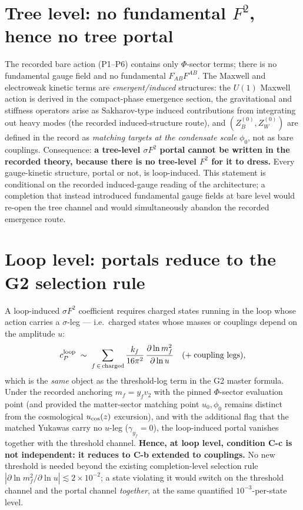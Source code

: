 \documentclass[11pt,a4paper]{article}
\begin{document}
\section{Tree level: no fundamental $F^2$, hence no tree portal}
The recorded bare action (P1--P6) contains only $\Phi$-sector terms; there is
no fundamental gauge field and no fundamental $F_{AB}F^{AB}$. The Maxwell and
electroweak kinetic terms are \emph{emergent/induced} structures: the $U(1)$
Maxwell action is derived in the compact-phase emergence section, the
gravitational and stiffness operators arise as Sakharov-type induced
contributions from integrating out heavy modes (the recorded
induced-structure route), and $(Z_B^{(0)},Z_W^{(0)})$ are defined in the
record as \emph{matching targets at the condensate scale} $\phi_0$, not as
bare couplings. Consequence: \textbf{a tree-level $\sigma F^2$ portal cannot
be written in the recorded theory, because there is no tree-level $F^2$ for
it to dress.} Every gauge-kinetic structure, portal or not, is loop-induced.
This statement is conditional on the recorded induced-gauge reading of the
architecture; a completion that instead introduced fundamental gauge fields
at bare level would re-open the tree channel and would simultaneously abandon
the recorded emergence route.

\section{Loop level: portals reduce to the G2 selection rule}
A loop-induced $\sigma F^2$ coefficient requires charged states running in
the loop whose action carries a $\sigma$-leg --- i.e.\ charged states whose
masses or couplings depend on the amplitude $u$:
\[
c_P^{\rm loop}\;\sim\;\sum_{f\,\in\,\text{charged}}\frac{k_f}{16\pi^2}\,
\frac{\partial\ln m_f^2}{\partial\ln u}\quad(+\;\text{coupling legs}),
\]
which is the \emph{same} object as the threshold-log term in the G2 master
formula. Under the recorded anchoring $m_f=y_fv_2$ with the pinned
$\Phi$-sector evaluation point (and provided the matter-sector matching point
$u_0,\phi_0$ remains distinct from the cosmological $u_{\rm cos}(z)$
excursion), and with the additional flag that the matched Yukawas carry no
$u$-leg ($\gamma_{y_f}=0$), the loop-induced portal vanishes together with
the threshold channel. \textbf{Hence, at loop level, condition C-c is not
independent: it reduces to C-b extended to couplings.} No new threshold is
needed beyond the existing completion-level selection rule
$|\partial\ln m_f^2/\partial\ln u|\lesssim2\times10^{-2}$; a state violating
it would switch on the threshold channel and the portal channel
\emph{together}, at the same quantified $10^{-3}$-per-state level.
\end{document}
